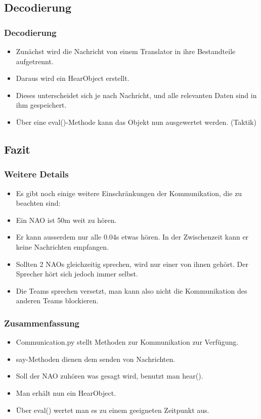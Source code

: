 \subsection{Decodierung}
\frame
{
  \frametitle{Decodierung}
  
  \begin{itemize}
    \item<1-> Zun\"achst wird die Nachricht von einem Translator in ihre Bestandteile aufgetrennt.
    \item<2-> Daraus wird ein HearObject erstellt.
    \item<3-> Dieses unterscheidet sich je nach Nachricht, und alle relevanten Daten sind in ihm gespeichert.
    \item<4-> \"Uber eine eval()-Methode kann das Objekt nun ausgewertet werden. (Taktik)
  \end{itemize}
}

\subsection{Fazit}
\frame
{
  \frametitle{Weitere Details}
  
  \begin{itemize}
    \item<1-> Es gibt noch einige weitere Einschr\"ankungen der Kommunikation, die zu beachten sind: \vskip0.5cm
    \item<2-> Ein NAO ist 50m weit zu h\"oren.
    \item<3-> Er kann ausserdem nur alle 0.04s etwas h\"oren. In der Zwischenzeit kann er keine Nachrichten empfangen.
    \item<4-> Sollten 2 NAOs gleichzeitig sprechen, wird nur einer von ihnen geh\"ort. Der Sprecher h\"ort sich jedoch immer selbst.
    \item<5-> Die Teams sprechen versetzt, man kann also nicht die Kommunikation des anderen Teams blockieren.
  \end{itemize}
}

\frame
{
  \frametitle{Zusammenfassung}

  \begin{itemize}
    \item<1-> Communication.py stellt Methoden zur Kommunikation zur Verf\"ugung.
    \item<2-> say-Methoden dienen dem senden von Nachrichten.
    \item<3-> Soll der NAO zuh\"oren was gesagt wird, benutzt man hear().
    \item<4-> Man erh\"alt nun ein HearObject.
    \item<5-> \"Uber eval() wertet man es zu einem geeigneten Zeitpunkt aus.
  \end{itemize}
}